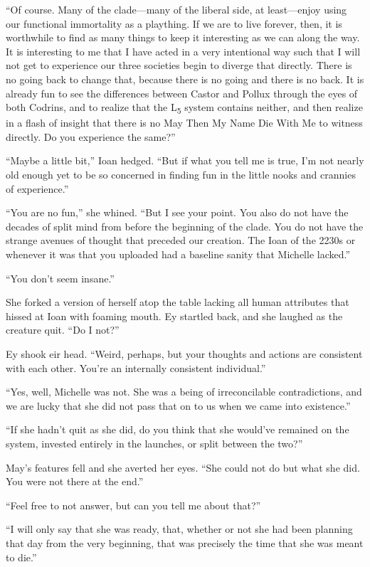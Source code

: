 ``Of course. Many of the clade---many of the liberal side, at least---enjoy using our functional immortality as a plaything. If we are to live forever, then, it is worthwhile to find as many things to keep it interesting as we can along the way. It is interesting to me that I have acted in a very intentional way such that I will not get to experience our three societies begin to diverge that directly. There is no going back to change that, because there is no going and there is no back. It is already fun to see the differences between Castor and Pollux through the eyes of both Codrins, and to realize that the L\textsubscript{5} system contains neither, and then realize in a flash of insight that there is no May Then My Name Die With Me to witness directly. Do you experience the same?''

``Maybe a little bit,'' Ioan hedged. ``But if what you tell me is true, I'm not nearly old enough yet to be so concerned in finding fun in the little nooks and crannies of experience.''

``You are no fun,'' she whined. ``But I see your point. You also do not have the decades of split mind from before the beginning of the clade. You do not have the strange avenues of thought that preceded our creation. The Ioan of the 2230s or whenever it was that you uploaded had a baseline sanity that Michelle lacked.''

``You don't seem insane.''

She forked a version of herself atop the table lacking all human attributes that hissed at Ioan with foaming mouth. Ey startled back, and she laughed as the creature quit. ``Do I not?''

Ey shook eir head. ``Weird, perhaps, but your thoughts and actions are consistent with each other. You're an internally consistent individual.''

``Yes, well, Michelle was not. She was a being of irreconcilable contradictions, and we are lucky that she did not pass that on to us when we came into existence.''

``If she hadn't quit as she did, do you think that she would've remained on the system, invested entirely in the launches, or split between the two?''

May's features fell and she averted her eyes. ``She could not do but what she did. You were not there at the end.''

``Feel free to not answer, but can you tell me about that?''

``I will only say that she was ready, that, whether or not she had been planning that day from the very beginning, that was precisely the time that she was meant to die.''

